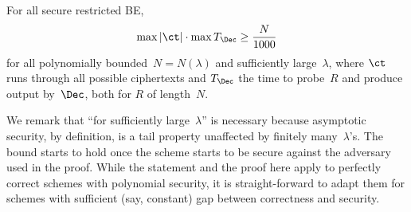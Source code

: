\begin{theorem}\label{thm:lower-bound}
For all secure restricted BE,
\begin{align*}
\max{|\ct|}\cdot\max{T_\Dec}\geq\frac{N}{1000}
\end{align*}
for all polynomially bounded~${N=N(\lambda)}$ and sufficiently large~$\lambda$,
where $\ct$ runs through all possible ciphertexts and
$T_\Dec$ the time to probe~$R$ and produce output by~$\Dec$,
both for $R$ of length~$N$.
\end{theorem}

\noindent
We remark that ``for sufficiently large~$\lambda$''
is necessary because asymptotic security, by definition, is
a tail property unaffected by finitely many~$\lambda$'s.
The bound starts to hold once the scheme starts to be secure
against the adversary used in the proof.
While the statement and the proof here
apply to perfectly correct schemes with polynomial security,
it is straight-forward to adapt them
for schemes with sufficient (say, constant) gap
between correctness and security.
